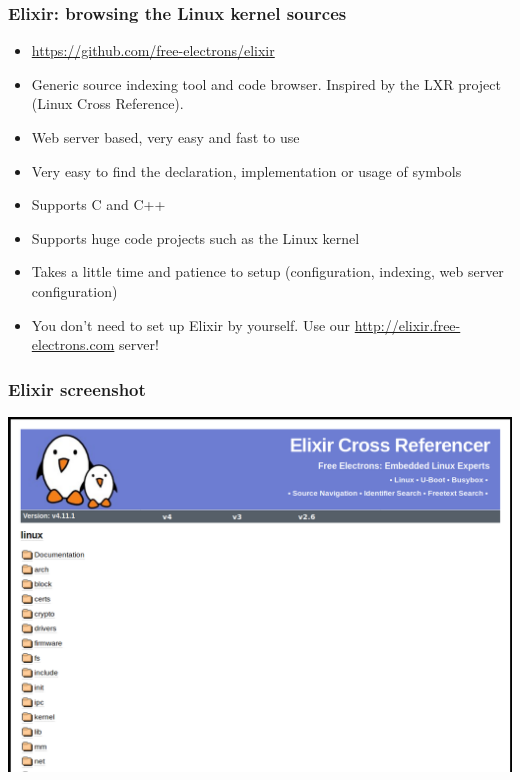 \begin{frame}
  \frametitle{Elixir: browsing the Linux kernel sources}
  \begin{itemize}
  \item \url{https://github.com/free-electrons/elixir}
  \item Generic source indexing tool and code browser.
        Inspired by the LXR project (Linux Cross Reference).
  \item Web server based, very easy and fast to use
  \item Very easy to find the declaration, implementation or usage
    of symbols
  \item Supports C and C++
  \item Supports huge code projects such as the Linux kernel
  \item Takes a little time and patience to setup (configuration,
    indexing, web server configuration)
  \item You don't need to set up Elixir by yourself. Use our
    \url{http://elixir.free-electrons.com} server!
  \end{itemize}
\end{frame}

\begin{frame}
  \frametitle{Elixir screenshot}
  \begin{center}
    \includegraphics[height=0.8\textheight]{slides/kernel-source-code-management/elixir.png}
  \end{center}
\end{frame}

